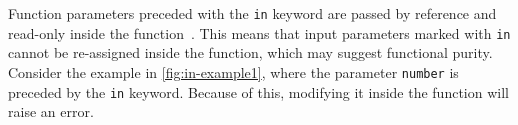 \documentclass[a4paper,12pt]{article}
\begin{document}

Function parameters preceded with the \texttt{in} keyword are passed by reference and read-only inside the function~\cite{microsoft-in-modifier}. This means that input parameters marked with \texttt{in} cannot be re-assigned inside the function, which may suggest functional purity. Consider the example in \autoref{fig:in-example1}, where the parameter \texttt{number} is preceded by the \texttt{in} keyword. Because of this, modifying it inside the function will raise an error.
\end{document}
